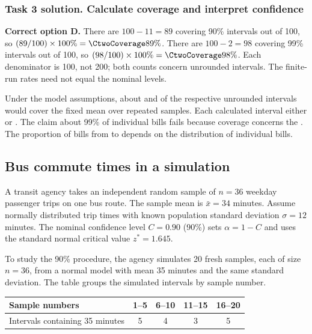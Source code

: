 \noindent\begin{minipage}{\linewidth}
\subsubsection*{Task 3 solution. Calculate coverage and interpret confidence}
\label{sol:c2-2-c}

\textbf{Correct option D.} There are $100-11=89$ covering 90\% intervals out of 100, so $(89/100)\times100\%=\CtwoCoverage{89\%}$. There are $100-2=98$ covering 99\% intervals out of 100, so $(98/100)\times100\%=\CtwoCoverage{98\%}$. Each denominator is 100, not 200; both counts concern unrounded intervals. The finite-run rates need not equal the nominal levels.

Under the model assumptions, about  and  of the respective unrounded intervals would cover the fixed mean over repeated samples. Each calculated interval either  or . The claim about 99\% of individual bills fails because coverage concerns the . The proportion of bills from  to  depends on the distribution of individual bills.

\par\vspace{3mm}
\end{minipage}\par

\clearpage

\subsection{Bus commute times in a simulation}
\label{prob:c2-3}

A transit agency takes an independent random sample of $n=36$ weekday passenger trips on one bus route. The sample mean is $\bar{x}=34$ minutes. Assume normally distributed trip times with known population standard deviation $\sigma=12$ minutes. The nominal confidence level $C=0.90$ (90\%) sets $\alpha=1-C$ and uses the standard normal critical value $z^*=1.645$.

To study the 90\% procedure, the agency simulates 20 fresh samples, each of size $n=36$, from a normal model with mean 35 minutes and the same standard deviation. The table groups the simulated intervals by sample number.

\begin{center}
\begin{tabular}{@{}lcccc@{}}
    \toprule
    Sample numbers & 1--5 & 6--10 & 11--15 & 16--20 \\
    \midrule
    Intervals containing 35 minutes & 5 & 4 & 3 & 5 \\
    \bottomrule
\end{tabular}
\end{center}


